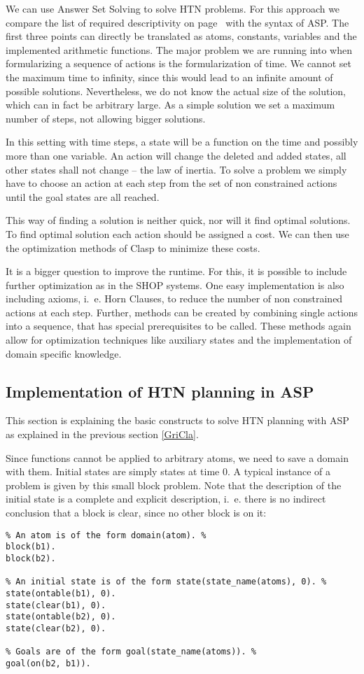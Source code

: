 \documentclass[10pt,a4paper]{article}
\begin{document}
We can use Answer Set Solving to solve HTN problems. For this approach we compare the list of required descriptivity on page~\pageref{HTNreq} with the syntax of ASP. The first three points can directly be translated as atoms, constants, variables and the implemented arithmetic functions.
The major problem we are running into when formularizing a sequence of actions is the formularization of time. We cannot set the maximum time to infinity, since this would lead to an infinite amount of possible solutions. Nevertheless, we do not know the actual size of the solution, which can in fact be arbitrary large. As a simple solution we set a maximum number of steps, not allowing bigger solutions.

In this setting with time steps, a state will be a function on the time and possibly more than one variable. An action will change the deleted and added states, all other states shall not change -- the law of inertia. To solve a problem we simply have to choose an action at each step from the set of non constrained actions until the goal states are all reached.

This way of finding a solution is neither quick, nor will it find optimal solutions. To find optimal solution each action should be assigned a cost. We can then use the optimization methods of Clasp to minimize these costs.

It is a bigger question to improve the runtime. For this, it is possible to include further optimization as in the SHOP systems. One easy implementation is also including axioms, i.~e. Horn Clauses, to reduce the number of non constrained actions at each step. Further, methods can be created by combining single actions into a sequence, that has special prerequisites to be called. These methods again allow for optimization techniques like auxiliary states and the implementation of domain specific knowledge.

\subsection{Implementation of HTN planning in ASP}\label{HTNwithASP}

This section is explaining the basic constructs to solve HTN planning with ASP as explained in the previous section \ref{GriCla}.

Since functions cannot be applied to arbitrary atoms, we need to save a domain with them. Initial states are simply states at time 0. A typical instance of a problem is given by this small block problem. Note that the description of the initial state is a complete and explicit description, i.~e. there is no indirect conclusion that a block is clear, since no other block is on it:\label{ProbDesc}
\begin{lstlisting}
% An atom is of the form domain(atom). %
block(b1).
block(b2).

% An initial state is of the form state(state_name(atoms), 0). %
state(ontable(b1), 0).
state(clear(b1), 0).
state(ontable(b2), 0).
state(clear(b2), 0).

% Goals are of the form goal(state_name(atoms)). %
goal(on(b2, b1)).
\end{lstlisting}
\end{document}
